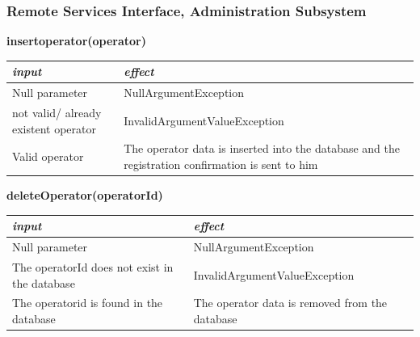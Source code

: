 \documentclass{article}
\begin{document}
\begin{flushleft}
      
      
      
      
      
      
      \subsubsection{Remote Services Interface, Administration Subsystem}
      
   \begin{center}
   \begin {flushleft}
    \textbf{insertoperator(operator)}
    \end{flushleft}
        \begin{tabular}{  |  p{6cm} | p{6cm} |}
    \hline
    \textit{input} &  \textit{effect} \\
    \hline
    
    Null parameter & NullArgumentException
     \\ 
  \hline
   not valid/ already existent operator & InvalidArgumentValueException  \\
  \hline
  Valid operator & The operator data is inserted  into the database and the registration confirmation is sent to him    \\
  \hline
    \end{tabular}
\end{center}


  \begin{center}
   \begin {flushleft}
    \textbf{deleteOperator(operatorId)}
    \end{flushleft}
        \begin{tabular}{  |  p{6cm} | p{6cm} |}
    \hline
    \textit{input} &  \textit{effect} \\
    \hline
    
    Null parameter & NullArgumentException
     \\ 
  \hline
  The operatorId does not exist in the database & InvalidArgumentValueException  \\
  \hline
  The operatorid is found in the database & The operator data is removed from the database
   \\
  \hline
    \end{tabular}
\end{center}   
      
      
      
      
   
   \newpage  
   

\end{flushleft}
\end{document}
